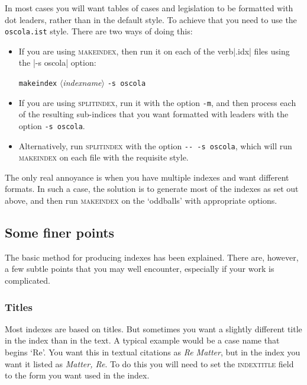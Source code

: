 \documentclass[a5paper,fontsize=9pt,DIV=1]{scrartcl}
\newcommand\angledtext[1]{$\langle$\textit{#1}\/$\rangle$}
\begin{document}
In most cases you will want tables of cases and legislation to be
formatted with dot leaders, rather than in the default style. To
achieve that you need to use the \verb|oscola.ist| style. There are
two ways of doing this:
\begin{itemize}
\item If you are using \textsc{makeindex}, then run it on each of the verb|.idx| files using the |-s oscola| option:
\begin{center}
  \texttt{makeindex} \angledtext{indexname} \texttt{-s oscola}
\end{center}
\item If you are using \textsc{splitindex}, run it with the option
  \verb|-m|, and then process each of the resulting sub-indices that
  you want formatted with leaders with the option \verb|-s oscola|.
\item Alternatively, run \textsc{splitindex} with the option \verb|-- -s oscola|, which will run \textsc{makeindex} on each file with the requisite style.
\end{itemize}

The only real annoyance is when you have multiple indexes and want
different formats. In such a case, the solution is to generate most of
the indexes as set out above, and then run \textsc{makeindex} on the
`oddballs' with appropriate options.

\subsection{Some finer points}

The basic method for producing indexes has been explained. There are,
however, a few subtle points that you may well encounter, especially
if your work is complicated.

\subsubsection{Titles}

Most indexes are based on titles. But sometimes you want a slightly
different title in the index than in the text. A typical example would
be a case name that begins `Re'. You want this in textual citations as
\emph{Re Matter}, but in the index you want it listed as \emph{Matter,
  Re}. To do this you will need to set the \textsc{indextitle} field
to the form you want used in the index.
\end{document}
